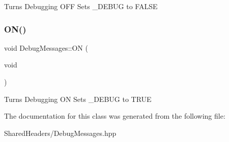 Turns Debugging O\+FF Sets \+\_\+\+D\+E\+B\+UG to F\+A\+L\+SE \mbox{\label{classDebugMessages_a95866775dcf301773daa7bed529c557e}} 
\subsubsection{\texorpdfstring{O\+N()}{ON()}}
{\footnotesize\ttfamily void Debug\+Messages\+::\+ON (\begin{DoxyParamCaption}\item[{void}]{ }\end{DoxyParamCaption})\hspace{0.3cm}{\ttfamily [inline]}}

Turns Debugging ON Sets \+\_\+\+D\+E\+B\+UG to T\+R\+UE 

The documentation for this class was generated from the following file\+:\begin{DoxyCompactItemize}
\item 
Shared\+Headers/Debug\+Messages.\+hpp\end{DoxyCompactItemize}
